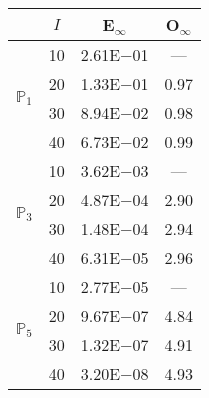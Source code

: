\begin{table}[H]
\centering
\begin{tabular}{@{}l c c c@{}}
\toprule
 & $I$ & E$_{\infty}$ & O$_{\infty}$\\
\midrule
\multirow{4}{*}{$\mathbb{P}_{1}$}
 & 10 & 2.61E$-$01 & ---\\
 & 20 & 1.33E$-$01 & 0.97  \\
 & 30 & 8.94E$-$02 & 0.98  \\
 & 40 & 6.73E$-$02 & 0.99  \\
\midrule
\multirow{4}{*}{$\mathbb{P}_{3}$}
 & 10 & 3.62E$-$03 & ---\\
 & 20 & 4.87E$-$04 & 2.90  \\
 & 30 & 1.48E$-$04 & 2.94  \\
 & 40 & 6.31E$-$05 & 2.96  \\
\midrule
\multirow{4}{*}{$\mathbb{P}_{5}$}
 & 10 & 2.77E$-$05 & ---\\
 & 20 & 9.67E$-$07 & 4.84  \\
 & 30 & 1.32E$-$07 & 4.91  \\
 & 40 & 3.20E$-$08 & 4.93  \\
\bottomrule
\end{tabular}
\end{table}
